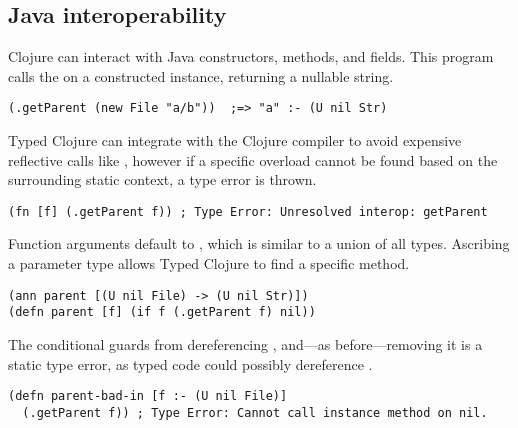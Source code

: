 \subsection{Java interoperability}
\label{sec:overviewjavainterop}

Clojure can interact with Java constructors, methods, and fields.
This program calls the  on a constructed
instance, returning a nullable string.

\begin{exmp}
\begin{lstlisting}
(.getParent (new File "a/b"))  ;=> "a" :- (U nil Str)
\end{lstlisting}
\label{example:getparent-direct-constructor}
\end{exmp}
%
Typed Clojure can integrate with the Clojure compiler to avoid expensive reflective 
calls like , however if a specific overload cannot be found based on the
surrounding static context, a type error is thrown.
%
\begin{lstlisting}
(fn [f] (.getParent f)) ; Type Error: Unresolved interop: getParent
\end{lstlisting}
%
Function arguments default to , which is similar to a union of all types. Ascribing
a parameter type allows Typed Clojure to find a specific method.


\begin{exmp}
\begin{lstlisting}
(ann parent [(U nil File) -> (U nil Str)])
(defn parent [f] (if f (.getParent f) nil))
\end{lstlisting}
\label{example:parent-if}
\end{exmp}


The conditional guards from dereferencing , and---as before---removing 
it is a static type error, as typed code could possibly dereference .
\begin{lstlisting}
(defn parent-bad-in [f :- (U nil File)]
  (.getParent f)) ; Type Error: Cannot call instance method on nil.
\end{lstlisting}

